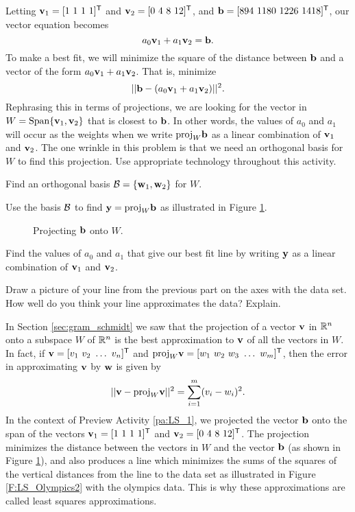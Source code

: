 \begin{pa}
Letting $\vv_1 = [1 \ 1 \ 1 \ 1]^{\tr}$ and $\vv_2 = [0 \ 4 \ 8 \ 12]^{\tr}$, and $\vb = [894 \ 1180 \ 1226 \ 1418]^{\tr}$, our vector equation becomes
\[a_0 \mathbf{v}_1 + a_1\mathbf{v}_2 = \mathbf{b}.\]
To make a best fit, we will minimize the square of the distance between $\mathbf{b}$ and a vector of the form $a_0\mathbf{v}_1 + a_1 \mathbf{v}_2$. That is, minimize
\begin{equation} \label{eq:LS_line_1} 
||\mathbf{b} - (a_0 \mathbf{v}_1 + a_1\mathbf{v}_2)||^2.
\end{equation} 
Rephrasing this in terms of projections, we are looking for the vector in $W = \text{Span}\{\mathbf{v}_1, \mathbf{v}_2\}$ that is closest to $\mathbf{b}$.  In other words, the values of $a_0$ and $a_1$ will occur as the weights when we write $\text{proj}_{W} \mathbf{b}$ as a linear combination of $\mathbf{v}_1$ and $\mathbf{v}_2$. The one wrinkle in this problem is that we need an orthogonal basis for $W$ to find this projection. Use appropriate technology throughout this activity. 

\be
\item Find an orthogonal basis $\mathcal{B} = \{\mathbf{w}_1, \mathbf{w}_2\}$ for $W$. 

\item Use the basis $\mathcal{B}$ to find $\mathbf{y} = \text{proj}_{W} \mathbf{b}$ as illustrated in Figure \ref{F:6_f_proj}.
\begin{figure}[h]
    \begin{center}
    \caption{Projecting $\mathbf{b}$ onto $W$.}
    \label{F:6_f_proj}
    \end{center}
    \end{figure} 

\item Find the values of $a_0$ and $a_1$ that give our best fit line by writing $\mathbf{y}$ as a linear combination of $\mathbf{v}_1$ and $\mathbf{v}_2$. 

\item Draw a picture of your line from the previous part on the axes with the data set. How well do you think your line approximates the data? Explain. 
	
\ee

\end{pa}

 
In Section \ref{sec:gram_schmidt} we saw that the projection of a vector $\mathbf{v}$ in $\mathbb{R}^n$ onto a subspace $W$ of $\mathbb{R}^n$ is the best approximation to $\mathbf{v}$ of all the vectors in $W$. In fact, if $\vv = [v_1 \ v_2 \ \ldots \ v_n]^{\tr}$ and $\proj_W \vv =  [w_1 \ w_2 \ w_3 \ \ldots \ w_m]^{\tr}$, then the error in approximating $\mathbf{v}$ by $\mathbf{w}$ is given by 
\[|| \mathbf{v} - \text{proj}_W \mathbf{v} ||^2 = \sum_{i=1}^m (v_i - w_i)^2.\]
In the context of Preview Activity \ref{pa:LS_1}, we projected the vector $\mathbf{b}$ onto the span of the vectors $\vv_1 = [1 \ 1 \ 1 \ 1]^{\tr}$ and $\vv_2 = [0 \ 4 \ 8 \ 12]^{\tr}$. The projection minimizes the distance between the vectors in $W$ and the vector $\mathbf{b}$ (as shown in Figure \ref{F:6_f_proj}), and also produces a line which minimizes the sums of the squares of the vertical distances from the line to the data set as illustrated in Figure \ref{F:LS_Olympics2} with the olympics data. This is why these approximations are called least squares approximations. 

